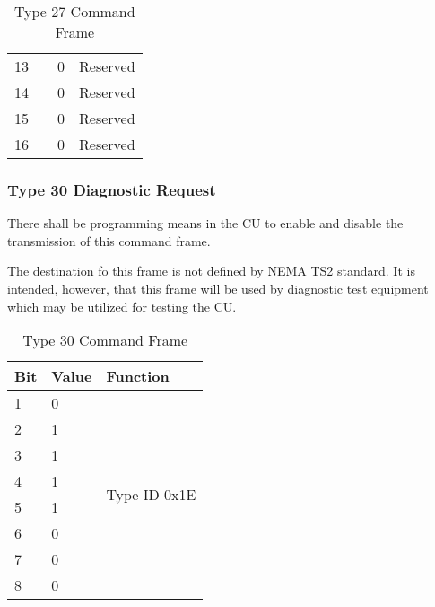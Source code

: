 \documentclass[]{article}
\begin{document}
\begin{table}[ht]
\begin{tabular}{llll}
		13           &                    & 0                 & Reserved                         \\
		14           &                    & 0                 & Reserved                         \\
		15           &                    & 0                 & Reserved                         \\
		16           &                    & 0                 & Reserved                         \\ \hline
	\end{tabular}
	\caption{Type 27 Command Frame}
	\label{tab:type-27-frame}
\end{table}

\clearpage 

\subsubsection {Type 30 Diagnostic Request}
There shall be programming means in the CU to enable and disable the transmission of this command frame.

The destination fo this frame is not defined by NEMA TS2 standard. It is intended, however, that this frame will be used by diagnostic test equipment which may be utilized for testing the CU.

\begin{table}[ht]
	\centering
	\begin{tabular}{lll}
		\hline
		\textbf{Bit} & \textbf{Value} & \textbf{Function}             \\ \hline
		1            & 0              & \multirow{8}{*}{Type ID 0x1E} \\
		2            & 1              &                               \\
		3            & 1              &                               \\
		4            & 1              &                               \\
		5            & 1              &                               \\
		6            & 0              &                               \\
		7            & 0              &                               \\
		8            & 0              &                               \\ \hline
	\end{tabular}
	\caption{Type 30 Command Frame}
	\label{tab:type-30-frame}
\end{table}
\end{document}
